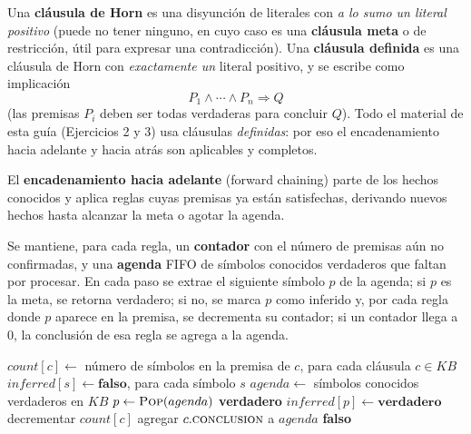\begin{definition}
Una \textbf{cláusula de Horn} es una disyunción de literales con \emph{a lo sumo un literal
positivo} (puede no tener ninguno, en cuyo caso es una \textbf{cláusula meta} o de restricción, útil
para expresar una contradicción). Una \textbf{cláusula definida} es una cláusula de Horn con
\emph{exactamente un} literal positivo, y se escribe como implicación
\[
    P_1 \land \cdots \land P_n \Rightarrow Q
\]
(las premisas $P_i$ deben ser todas verdaderas para concluir $Q$). Todo el material de esta guía
(Ejercicios 2 y 3) usa cláusulas \emph{definidas}: por eso el encadenamiento hacia adelante y hacia
atrás son aplicables y completos.
\end{definition}

El \textbf{encadenamiento hacia adelante} (forward chaining) parte de los hechos conocidos y aplica
reglas cuyas premisas ya están satisfechas, derivando nuevos hechos hasta alcanzar la meta o agotar
la agenda.

\begin{definition}
Se mantiene, para cada regla, un \textbf{contador} con el número de premisas aún no confirmadas, y
una \textbf{agenda} FIFO de símbolos conocidos verdaderos que faltan por procesar. En cada paso se
extrae el siguiente símbolo $p$ de la agenda; si $p$ es la meta, se retorna verdadero; si no, se
marca $p$ como inferido y, por cada regla donde $p$ aparece en la premisa, se decrementa su
contador; si un contador llega a $0$, la conclusión de esa regla se agrega a la agenda.
\end{definition}

\begin{algorithm}[H]
\caption{PL-FC-ENTAILS?($KB, q$) --- forward chaining con agenda y contadores}
\begin{algorithmic}[1]
\State $count[c] \gets$ número de símbolos en la premisa de $c$, para cada cláusula $c \in KB$
\State $inferred[s] \gets \textbf{falso}$, para cada símbolo $s$
\State $agenda \gets$ símbolos conocidos verdaderos en $KB$
    \State $p \gets \Call{Pop}{agenda}$
     \Return \textbf{verdadero}
    \EndIf
        \State $inferred[p] \gets \textbf{verdadero}$
            \State decrementar $count[c]$
                \State agregar $c.\textsc{conclusion}$ a $agenda$
            \EndIf
        \EndFor
    \EndIf
\EndWhile
\State \Return \textbf{falso}
\end{algorithmic}
\end{algorithm}

